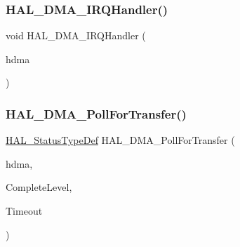\mbox{\label{group___d_m_a___exported___functions___group2_ga8c8564d06f6d39b702af1c5cbb7dd54a}} 
\subsubsection{\texorpdfstring{H\+A\+L\+\_\+\+D\+M\+A\+\_\+\+I\+R\+Q\+Handler()}{HAL\_DMA\_IRQHandler()}}
{\footnotesize\ttfamily void H\+A\+L\+\_\+\+D\+M\+A\+\_\+\+I\+R\+Q\+Handler (\begin{DoxyParamCaption}\item[{\hyperlink{group___d_m_a___exported___types_ga41b754a906b86bce54dc79938970138b}{D\+M\+A\+\_\+\+Handle\+Type\+Def} $\ast$}]{hdma }\end{DoxyParamCaption})}

\mbox{\label{group___d_m_a___exported___functions___group2_ga976a30472df973e3ad983f21289c9b5d}} 
\subsubsection{\texorpdfstring{H\+A\+L\+\_\+\+D\+M\+A\+\_\+\+Poll\+For\+Transfer()}{HAL\_DMA\_PollForTransfer()}}
{\footnotesize\ttfamily \hyperlink{stm32f4xx__hal__def_8h_a63c0679d1cb8b8c684fbb0632743478f}{H\+A\+L\+\_\+\+Status\+Type\+Def} H\+A\+L\+\_\+\+D\+M\+A\+\_\+\+Poll\+For\+Transfer (\begin{DoxyParamCaption}\item[{\hyperlink{group___d_m_a___exported___types_ga41b754a906b86bce54dc79938970138b}{D\+M\+A\+\_\+\+Handle\+Type\+Def} $\ast$}]{hdma,  }\item[{\hyperlink{group___d_m_a___exported___types_gaee3245eea8fa938edeb35a6c9596fd86}{H\+A\+L\+\_\+\+D\+M\+A\+\_\+\+Level\+Complete\+Type\+Def}}]{Complete\+Level,  }\item[{uint32\+\_\+t}]{Timeout }\end{DoxyParamCaption})}

